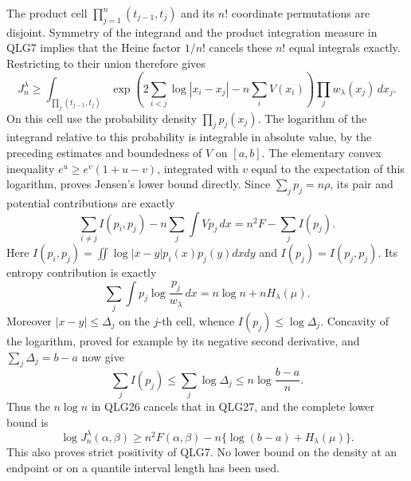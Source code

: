 \documentclass[11pt,a4paper]{article}
\begin{document}
The product cell \(\prod_{j=1}^n(t_{j-1},t_j)\) and its \(n!\)
coordinate permutations are disjoint. Symmetry of the integrand and the
product integration measure in QLG7 implies that the Heine factor
\(1/n!\) cancels these \(n!\) equal integrals exactly. Restricting
to their union therefore gives
\[
 J_n^\lambda\geq
 \int_{\prod_j(t_{j-1},t_j)}
 \exp\!\left(2\sum_{i<j}\log|x_i-x_j|-n\sum_iV(x_i)\right)
                       \prod_j w_\lambda(x_j)\,dx_j.
 \tag{QLG25}
\]
On this cell use the probability density \(\prod_jp_j(x_j)\).
The logarithm of the integrand relative to this probability is
integrable in absolute value, by the preceding estimates and boundedness
of \(V\) on \([a,b]\). The elementary convex inequality
\(e^u\geq e^v(1+u-v)\), integrated with
\(v\) equal to the expectation of this logarithm, proves Jensen's
lower bound directly. Since \(\sum_jp_j=n\rho\), its pair and
potential contributions are exactly
\[
 \sum_{i\ne j}I(p_i,p_j)-n\sum_j\int Vp_j\,dx
   =n^2F-\sum_j I(p_j).
\]
Here \(I(p_i,p_j)=\iint\log|x-y|p_i(x)p_j(y)dxdy\) and
\(I(p_j)=I(p_j,p_j)\). Its entropy contribution is exactly
\[
 \sum_j\int p_j\log\frac{p_j}{w_\lambda}\,dx
    =n\log n+nH_\lambda(\mu).
 \tag{QLG26}
\]
Moreover \(|x-y|\leq\Delta_j\) on the \(j\)-th cell, whence
\(I(p_j)\leq\log\Delta_j\). Concavity of the logarithm, proved
for example by its negative second derivative, and
\(\sum_j\Delta_j=b-a\) now give
\[
 \sum_jI(p_j)\leq\sum_j\log\Delta_j
       \leq n\log\frac{b-a}{n}.
 \tag{QLG27}
\]
Thus the \(n\log n\) in QLG26 cancels that in QLG27, and the complete
lower bound is
\[
 \boxed{\log J_n^\lambda(\alpha,\beta)
       \geq n^2F(\alpha,\beta)
                -n\{\log(b-a)+H_\lambda(\mu)\}.}
 \tag{QLG28}
\]
This also proves strict positivity of QLG7. No lower bound on the
density at an endpoint or on a quantile interval length has been used.
\end{document}
